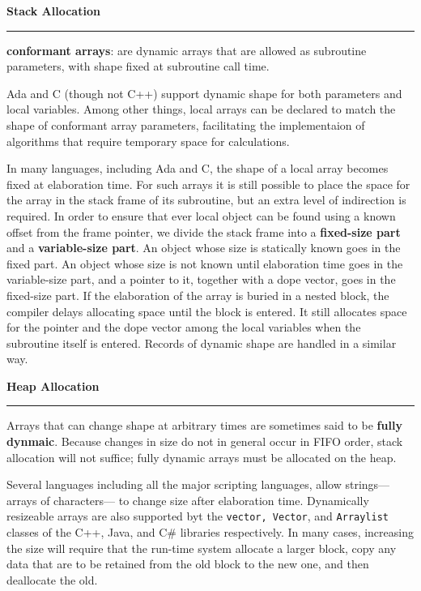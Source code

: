 \vskip 12pt

{\bf Stack Allocation}
\vskip 1mm
\hrule

\vskip 6pt
{\bf conformant arrays}: are dynamic arrays that are allowed as subroutine parameters, with shape fixed at subroutine call time.

\vskip 6pt
Ada and C (though not C++) support dynamic shape for both parameters and local variables. Among other things, local arrays can be declared to match  the shape of conformant array parameters, facilitating the implementaion of algorithms that require temporary space for calculations.

\vskip 6pt
In many languages, including Ada and C, the shape of a local array becomes fixed at elaboration time. For such arrays it is still possible to place the space for the array in the stack frame of its subroutine, but an extra level of indirection is required. In order to ensure that ever local object can be found using a known offset from the frame pointer, we divide the stack frame into a {\bf fixed-size part} and a {\bf variable-size part}. An object whose size is statically known goes in the fixed part.  An object whose size is not known until elaboration time goes in the variable-size part, and a pointer to it, together with a dope vector, goes in the fixed-size part. If the elaboration of the array is buried in a nested block, the compiler delays allocating space until the block is entered. It still allocates space for the pointer and the dope vector among the local variables when the subroutine itself is entered. Records of dynamic shape are handled in a similar way.

\vskip 30pt

{\bf Heap Allocation}
\vskip 1mm
\hrule

\vskip 6pt
Arrays that can change shape at arbitrary times are sometimes said to be {\bf fully dynmaic}. Because changes in size do not in general occur in FIFO order, stack allocation will not suffice; fully dynamic arrays must be allocated on the heap.

\vskip 6pt
Several languages including all the major scripting languages, allow strings--- arrays of characters--- to change size after elaboration time. Dynamically resizeable arrays are also supported byt the {\tt vector, Vector}, and {\tt Arraylist} classes of the C++, Java, and C$\#$ libraries respectively. In many cases, increasing the size will require that the run-time system allocate a larger block, copy any data that are to be retained from the old block to the new one, and then deallocate the old.

